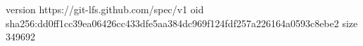 version https://git-lfs.github.com/spec/v1
oid sha256:dd0ff1cc39ea06426cc433dfe5aa384dc969f124fdf257a226164a0593c8ebe2
size 349692
